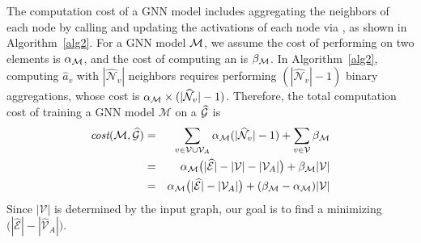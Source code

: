 The computation cost of a GNN model includes aggregating the neighbors of each node by calling  and updating the activations of each node via , as shown in Algorithm~\ref{alg2}. 
For a GNN model $\mathcal{M}$, we assume the cost of performing  on two elements is $\alpha_{\mathcal{M}}$, and the cost of computing an  is $\beta_{\mathcal{M}}$.
In Algorithm~\ref{alg2}, computing $\widehat{a}_v$ with $|\mathcal{\widehat{N}}_v|$ neighbors requires performing $(|\mathcal{\widehat{N}}_v|-1)$ binary aggregations, whose cost is $\alpha_{\mathcal{M}}\times(|\mathcal{\widehat{N}}_v|-1)$.
Therefore, the total computation cost of training a GNN model $\mathcal{M}$ on a \xg $\mathcal{\widehat{G}}$ is
\begin{eqnarray*}
\mbox{\rm\em cost}(\mathcal{M}, \mathcal{\widehat{G}}) & = &\sum_{v \in \mathcal{V} \cup \mathcal{V}_A} \alpha_{\mathcal{M}} (|\mathcal{\widehat{N}}_v| - 1) + \sum_{v \in \mathcal{V}} \beta_{\mathcal{M}} \\
& = & \alpha_{\mathcal{M}} \big(|\mathcal{\widehat{E}}| - |\mathcal{V}| - |\mathcal{V}_A|\big) + \beta_{\mathcal{M}} |\mathcal{V} |\\
& = & \alpha_{\mathcal{M}}\big(|\mathcal{\widehat{E}}| - |\mathcal{V}_A|\big) + (\beta_{\mathcal{M}} - \alpha_{\mathcal{M}}) |\mathcal{V}|
\end{eqnarray*}
Since $|\mathcal{V}|$ is determined by the input graph, our goal is to find a \xg minimizing $\big(|\mathcal{\widehat{E}}| -  |\mathcal{\widehat{V}}_A| \big)$.

